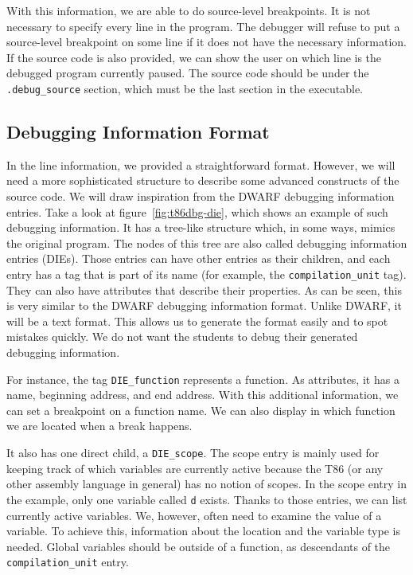 With this information, we are able to do source-level breakpoints. It is not
necessary to specify every line in the program. The debugger will refuse to put
a source-level breakpoint on some line if it does not have the necessary
information. If the source code is also provided, we can show the user on which
line is the debugged program currently paused. The source code should be under
the \verb|.debug_source| section, which must be the last section in the
executable.

\subsection{Debugging Information Format}
In the line information, we provided a straightforward format. However, we will
need a more sophisticated structure to describe some advanced constructs of the
source code. We will draw inspiration from the DWARF debugging information
entries. Take a look at figure~\ref{fig:t86dbg-die}, which shows an example of
such debugging information. It has a tree-like structure which, in some ways,
mimics the original program. The nodes of this tree are also called debugging
information entries (DIEs). Those entries can have other entries as their
children, and each entry has a tag that is part of its name (for example, the
\verb|compilation_unit| tag). They can also have attributes that describe their
properties. As can be seen, this is very similar to the DWARF debugging
information format. Unlike DWARF, it will be a text format. This allows us to
generate the format easily and to spot mistakes quickly. We do not want the
students to debug their generated debugging information.

For instance, the tag \verb|DIE_function| represents a function. As attributes,
it has a name, beginning address, and end address. With this additional
information, we can set a breakpoint on a function name. We can also display in
which function we are located when a break happens.

It also has one direct child, a \verb|DIE_scope|. The scope entry is mainly
used for keeping track of which variables are currently active because the T86
(or any other assembly language in general) has no notion of scopes. In the
scope entry in the example, only one variable called \texttt{d} exists. Thanks
to those entries, we can list currently active variables. We, however, often
need to examine the value of a variable. To achieve this, information about the
location and the variable type is needed. Global variables should be outside of
a function, as descendants of the \verb|compilation_unit| entry.

